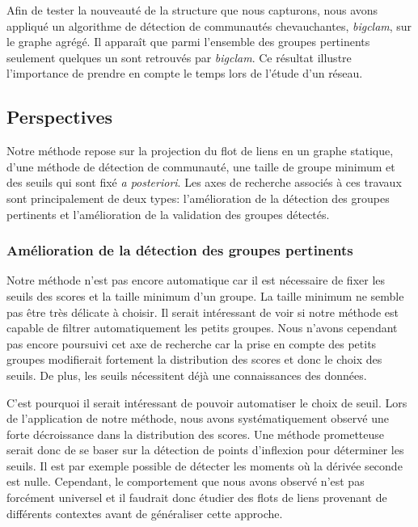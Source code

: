 Afin de tester la nouveauté de la structure que nous capturons, nous avons appliqué un algorithme de détection de communautés chevauchantes, \emph{bigclam}, sur le graphe agrégé.
Il apparaît que parmi l'ensemble des groupes pertinents seulement quelques un sont retrouvés par \emph{bigclam}.
Ce résultat illustre l'importance de prendre en compte le temps lors de l'étude d'un réseau.


\subsection{Perspectives}

Notre méthode repose sur la projection du flot de liens en un graphe statique, d'une méthode de détection de communauté, une taille de groupe minimum et des seuils qui sont fixé \emph{a posteriori}.
Les axes de recherche associés à ces travaux sont principalement de deux types: l'amélioration de la détection des groupes pertinents et l'amélioration de la validation des groupes détectés.

\subsubsection{Amélioration de la détection des groupes pertinents}
Notre méthode n'est pas encore automatique car il est nécessaire de fixer les seuils des scores et la taille minimum d'un groupe.
La taille minimum ne semble pas être très délicate à choisir.
Il serait intéressant de voir si notre méthode est capable de filtrer automatiquement les petits groupes.
Nous n'avons cependant pas encore poursuivi cet axe de recherche car la prise en compte des petits groupes modifierait fortement la distribution des scores et donc le choix des seuils.
De plus, les seuils nécessitent déjà une connaissances des données.

C'est pourquoi il serait intéressant de pouvoir automatiser le choix de seuil.
Lors de l'application de notre méthode, nous avons systématiquement observé une forte décroissance dans la distribution des scores.
Une méthode prometteuse serait donc de se baser sur la détection de points d'inflexion pour déterminer les seuils.
Il est par exemple possible de détecter les moments où la dérivée seconde est nulle.
Cependant, le comportement que nous avons observé n'est pas forcément universel et il faudrait donc étudier des flots de liens provenant de différents contextes avant de généraliser cette approche.


